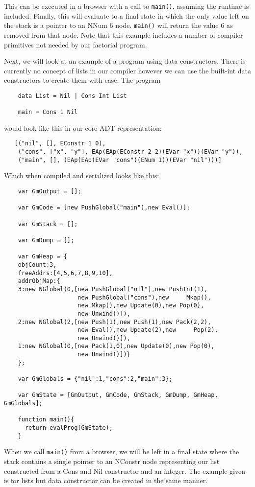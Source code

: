 \noindent This can be executed in a browser with a call to \verb!main()!, assuming
the runtime is included. Finally, this will evaluate to a final state in which
the only value left on the stack is a pointer to an NNum 6 node. \verb!main()! will
return the value 6 as removed from that node. Note that this example includes a
number of compiler primitives not needed by our factorial program.

Next, we will look at an example of a program using data constructors. There is
currently no concept of lists in our compiler however we can use the built-int
data constructors to create them with ease. The program

\begin{verbatim}
    data List = Nil | Cons Int List

    main = Cons 1 Nil
\end{verbatim}

\noindent would look like this in our core ADT representation:

\begin{verbatim}
   [("nil", [], EConstr 1 0),
    ("cons", ["x", "y"], EAp(EAp(EConstr 2 2)(EVar "x"))(EVar "y")),
    ("main", [], (EAp(EAp(EVar "cons")(ENum 1))(EVar "nil")))]
\end{verbatim}

\noindent Which when compiled and serialized looks like this:

\begin{verbatim}
    var GmOutput = [];
 
    var GmCode = [new PushGlobal("main"),new Eval()];
 
    var GmStack = [];
 
    var GmDump = [];
 
    var GmHeap = {
    objCount:3,
    freeAddrs:[4,5,6,7,8,9,10],
    addrObjMap:{
    3:new NGlobal(0,[new PushGlobal("nil"),new PushInt(1),
                     new PushGlobal("cons"),new     Mkap(),
                     new Mkap(),new Update(0),new Pop(0),
                     new Unwind()]),
    2:new NGlobal(2,[new Push(1),new Push(1),new Pack(2,2),
                     new Eval(),new Update(2),new     Pop(2),
                     new Unwind()]),
    1:new NGlobal(0,[new Pack(1,0),new Update(0),new Pop(0),
                     new Unwind()])}
    };
     
    var GmGlobals = {"nil":1,"cons":2,"main":3};
     
    var GmState = [GmOutput, GmCode, GmStack, GmDump, GmHeap, GmGlobals]; 
     
    function main(){
      return evalProg(GmState);
    }

\end{verbatim}

\noindent When we call \verb!main()! from a browser, we will be left in
a final state where the stack contains a single pointer to an NConstr
node representing our list constructed from a Cons and Nil constructor
and an integer. The example given is for lists but data constructor can
be created in the same manner.
